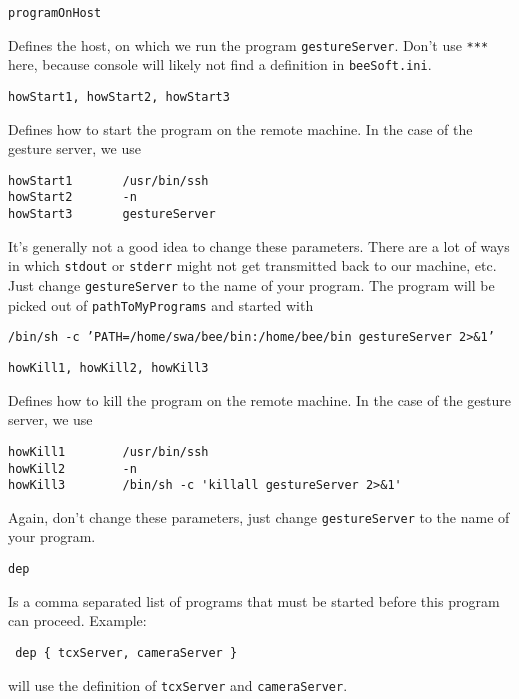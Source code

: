 \documentclass{article}
\begin{document}
\begin{description}
\item \texttt{programOnHost}

  Defines the host, on which we run the program \texttt{gestureServer}. Don't
  use \texttt{***} here, because console will likely not find a definition in 
  \texttt{beeSoft.ini}.

\item \texttt{howStart1, howStart2, howStart3}
  
  Defines how to start the program on the remote machine. In the case of the
  gesture server, we use

\begin{verbatim}
howStart1       /usr/bin/ssh
howStart2       -n
howStart3       gestureServer
\end{verbatim}
  
  It's generally not a good idea to change these parameters. There are a lot
  of ways in which \texttt{stdout} or \texttt{stderr} might not get
  transmitted back to our machine, etc. Just change \texttt{gestureServer} to
  the name of your program. The program will be picked out of
  \texttt{pathToMyPrograms}
  and started with 
  \begin{center}
    \small
    \texttt{/bin/sh -c 'PATH=/home/swa/bee/bin:/home/bee/bin gestureServer 2>\&1'}
  \end{center}


\item \texttt{howKill1, howKill2, howKill3}

  Defines how to kill the program on the remote machine. In the case of the
  gesture server, we use

\begin{verbatim}
howKill1        /usr/bin/ssh
howKill2        -n
howKill3        /bin/sh -c 'killall gestureServer 2>&1'
\end{verbatim}

  Again, don't change these parameters, just change \texttt{gestureServer} to
  the name of your program.

\item \texttt{dep}

  Is a comma separated list of programs that must be started before this
  program can proceed. Example:
  \begin{center}
    \texttt{ dep \{ tcxServer, cameraServer \} }
  \end{center}
  will use the definition of \texttt{tcxServer} and \texttt{cameraServer}.

\end{description}
\end{document}
